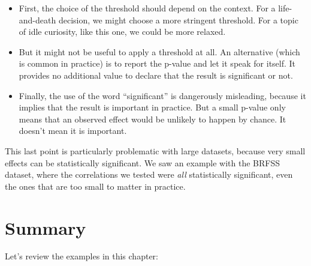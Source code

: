 \begin{itemize}
\item
  First, the choice of the threshold should depend on the context. For a
  life-and-death decision, we might choose a more stringent threshold.
  For a topic of idle curiosity, like this one, we could be more
  relaxed.
\item
  But it might not be useful to apply a threshold at all. An alternative
  (which is common in practice) is to report the p-value and let it
  speak for itself. It provides no additional value to declare that the
  result is significant or not.
\item
  Finally, the use of the word ``significant'' is dangerously
  misleading, because it implies that the result is important in
  practice. But a small p-value only means that an observed effect would
  be unlikely to happen by chance. It doesn't mean it is important.
\end{itemize}

This last point is particularly problematic with large datasets, because
very small effects can be statistically significant. We saw an example
with the BRFSS dataset, where the correlations we tested were \emph{all}
statistically significant, even the ones that are too small to matter in
practice.

\section{Summary}\label{summary}

Let's review the examples in this chapter:

